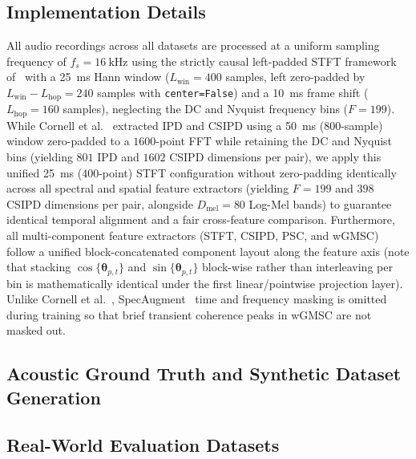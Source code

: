 \documentclass[lettersize,journal]{IEEEtran}
\begin{document}
\subsection{Implementation Details}
All audio recordings across all datasets are processed at a uniform sampling frequency of $f_s = \SI{16}{\kilo\hertz}$ using the strictly causal left-padded \gls{STFT} framework of~ with a \SI{25}{\milli\second} Hann window ($L_{\mathrm{win}} = 400$ samples, left zero-padded by $L_{\mathrm{win}} - L_{\mathrm{hop}} = 240$ samples with \texttt{center=False}) and a \SI{10}{\milli\second} frame shift ($L_{\mathrm{hop}} = 160$ samples), neglecting the DC and Nyquist frequency bins ($F = 199$). While Cornell et al.~\cite{cornell2022overlapped} extracted \gls{IPD} and \gls{CSIPD} using a \SI{50}{\milli\second} ($800$-sample) window zero-padded to a $1600$-point \acrshort{FFT} while retaining the DC and Nyquist bins (yielding $801$ \gls{IPD} and $1602$ \gls{CSIPD} dimensions per pair), we apply this unified \SI{25}{\milli\second} ($400$-point) \gls{STFT} configuration without zero-padding identically across all spectral and spatial feature extractors (yielding $F = 199$ and $398$ \gls{CSIPD} dimensions per pair, alongside $D_{\mathrm{mel}} = 80$ Log-Mel bands) to guarantee identical temporal alignment and a fair cross-feature comparison. Furthermore, all multi-component feature extractors (\gls{STFT}, \gls{CSIPD}, \gls{PSC}, and \gls{wGMSC}) follow a unified block-concatenated component layout along the feature axis (note that stacking $\cos\{\bm{\theta}_{p,t}\}$ and $\sin\{\bm{\theta}_{p,t}\}$ block-wise rather than interleaving per bin is mathematically identical under the first linear/pointwise projection layer). Unlike Cornell et al.~\cite{cornell2022overlapped}, SpecAugment~\cite{park2019specaugment} time and frequency masking is omitted during training so that brief transient coherence peaks in \gls{wGMSC} are not masked out.

\subsection{Acoustic Ground Truth and Synthetic Dataset Generation}

\subsection{Real-World Evaluation Datasets}
\end{document}
